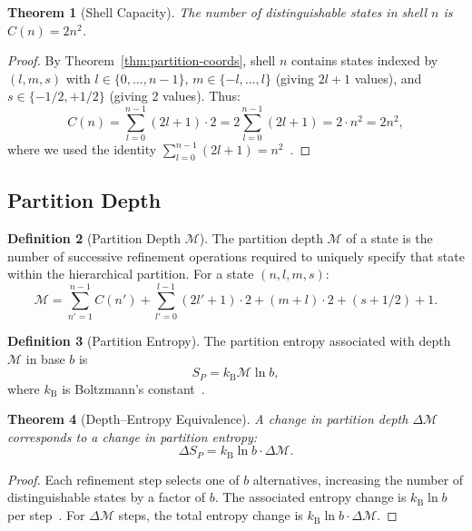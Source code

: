 \documentclass[11pt,twocolumn,a4paper]{article}
\newtheorem{theorem}{Theorem}[section]
\theoremstyle{definition}
\newtheorem{definition}[theorem]{Definition}
\theoremstyle{remark}
\newcommand{\kB}{k_{\mathrm{B}}}
\newcommand{\Depth}{\mathcal{M}}
\begin{document}
\begin{theorem}[Shell Capacity]
\label{thm:shell-capacity}
The number of distinguishable states in shell $n$ is $C(n) = 2n^2$.
\end{theorem}

\begin{proof}
By Theorem~\ref{thm:partition-coords}, shell $n$ contains states indexed by $(l, m, s)$ with $l \in \{0, \ldots, n-1\}$, $m \in \{-l, \ldots, l\}$ (giving $2l+1$ values), and $s \in \{-1/2, +1/2\}$ (giving 2 values). Thus:
\[
  C(n) = \sum_{l=0}^{n-1} (2l+1) \cdot 2 = 2 \sum_{l=0}^{n-1} (2l+1) = 2 \cdot n^2 = 2n^2,
\]
where we used the identity $\sum_{l=0}^{n-1}(2l+1) = n^2$~\citep{madelung1936}.
\end{proof}

\subsection{Partition Depth}
\label{sec:partition-depth}

\begin{definition}[Partition Depth $\Depth$]
\label{def:partition-depth}
The partition depth $\Depth$ of a state is the number of successive refinement operations required to uniquely specify that state within the hierarchical partition. For a state $(n, l, m, s)$:
\[
  \Depth = \sum_{n'=1}^{n-1} C(n') + \sum_{l'=0}^{l-1}(2l'+1)\cdot 2 + (m + l) \cdot 2 + (s + 1/2) + 1.
\]
\end{definition}

\begin{definition}[Partition Entropy]
\label{def:partition-entropy}
The partition entropy associated with depth $\Depth$ in base $b$ is
\[
  S_P = \kB \Depth \ln b,
\]
where $\kB$ is Boltzmann's constant~\citep{boltzmann1877}.
\end{definition}

\begin{theorem}[Depth--Entropy Equivalence]
\label{thm:depth-entropy}
A change in partition depth $\Delta\Depth$ corresponds to a change in partition entropy:
\[
  \Delta S_P = \kB \ln b \cdot \Delta \Depth.
\]
\end{theorem}

\begin{proof}
Each refinement step selects one of $b$ alternatives, increasing the number of distinguishable states by a factor of $b$. The associated entropy change is $\kB \ln b$ per step~\citep{boltzmann1877, landauer1961}. For $\Delta\Depth$ steps, the total entropy change is $\kB \ln b \cdot \Delta\Depth$.
\end{proof}
\end{document}
